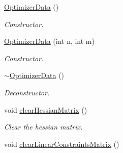 \begin{DoxyCompactItemize}
\item 
\hyperlink{classOSQPWrapper_1_1OptimizerData_aa41cc99a744074ac439f34467ca927a5}{Optimizer\+Data} ()\label{classOSQPWrapper_1_1OptimizerData_aa41cc99a744074ac439f34467ca927a5}

\begin{DoxyCompactList}\small\item\em Constructor. \end{DoxyCompactList}\item 
\hyperlink{classOSQPWrapper_1_1OptimizerData_a6daaeae8e8980f08d45b55fb07f1145a}{Optimizer\+Data} (int n, int m)
\begin{DoxyCompactList}\small\item\em Constructor. \end{DoxyCompactList}\item 
\hyperlink{classOSQPWrapper_1_1OptimizerData_a436b65c4d7f50d233c4dd1cd1a83cae6}{$\sim$\+Optimizer\+Data} ()\label{classOSQPWrapper_1_1OptimizerData_a436b65c4d7f50d233c4dd1cd1a83cae6}

\begin{DoxyCompactList}\small\item\em Deconstructor. \end{DoxyCompactList}\item 
void \hyperlink{classOSQPWrapper_1_1OptimizerData_aedc85562389cd5061f52db0449d200c8}{clear\+Hessian\+Matrix} ()\label{classOSQPWrapper_1_1OptimizerData_aedc85562389cd5061f52db0449d200c8}

\begin{DoxyCompactList}\small\item\em Clear the hessian matrix. \end{DoxyCompactList}\item 
void \hyperlink{classOSQPWrapper_1_1OptimizerData_aa80be22f78bc9f3442c7405ec0080170}{clear\+Linear\+Constraints\+Matrix} ()\label{classOSQPWrapper_1_1OptimizerData_aa80be22f78bc9f3442c7405ec0080170}


\end{DoxyCompactItemize}
